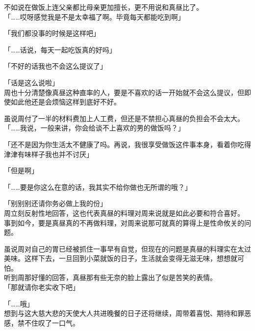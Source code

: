 不如说在做饭上连父亲都比母亲更加擅长，更不用说和真昼比了。\\

「……哎呀感觉我是不是太幸福了啊。毕竟每天都能吃到啊」

「我们都没事的时候是这样吧」

「……话说，每天一起吃饭真的好吗」

「不好的话我也不会这么提议了」

「话是这么说啦」\\

周也十分清楚像真昼这种直率的人，要是不喜欢的话一开始就不会这么提议，但即使如此他还是会烦恼这样到底好不好。

虽说周付了一半的材料费加上人工费，但还是不禁担心真昼的负担会不会太大。\\

「……我说，一般来讲，你会给谈不上喜欢的男的做饭吗？」

「还不是因为你生活太不健康了吗。再说，我很享受做饭这件事本身，看着你吃得津津有味样子我也并不讨厌」

「但是啊」

「……要是你这么在意的话，我其实不给你做也无所谓的哦？」

「别别别还请你务必做上我的份」\\

周立刻反射性地回答，这也代表真昼的料理对周来说就是如此必要和符合喜好。\\

事到如今，要是真昼真的不再做料理，对周来说那可就真的算得上是性命攸关的问题。

虽说周对自己的胃已经被抓住一事早有自觉，但现在的问题是真昼的料理实在太过美味。这样下去，一旦回到小菜就饭的日子，生活就会变得无滋无味，想想就可怕。\\

听到周那好懂的回答，真昼那有些无奈的脸上露出了似是苦笑的表情。\\

「那就请你老实收下吧」

「……哦」\\

想到与这大慈大悲的天使大人共进晚餐的日子还将继续，周带着喜悦、期待和罪恶感，禁不住叹了一口气。%
